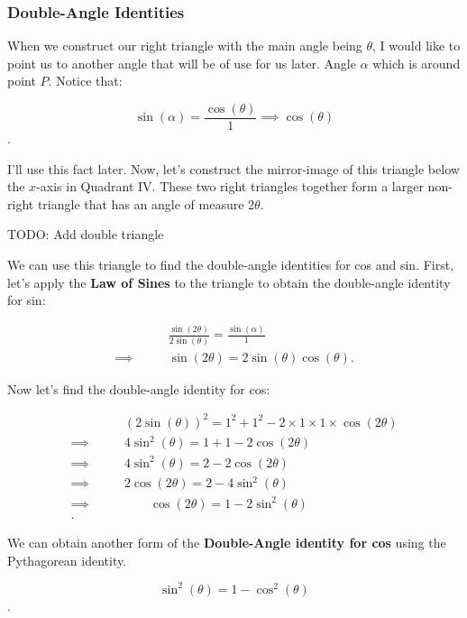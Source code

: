 
\subsubsection*{Double-Angle Identities}
\label{sub_sub_sec:double_angle_identities}

When we construct our right triangle with the main angle being $\theta$, I
would like to point us to another angle that will be of use for us later. Angle
$\alpha$ which is around point $P$. Notice that:

\[ \sin (\alpha) = \frac{\cos (\theta)}{1} \implies \cos (\theta) \].

I'll use this fact later. Now, let's construct the mirror-image of this
triangle below the $x$-axis in Quadrant IV. These two right triangles together
form a larger non-right triangle that has an angle of measure $2\theta$.

TODO: Add double triangle

We can use this triangle to find the double-angle identities for cos and sin.
First, let's apply the \textbf{Law of Sines} to the triangle to obtain the
double-angle identity for sin:

\begin{align*}
  \qquad&\frac{\sin (2\theta)}{2\sin (\theta)} = \frac{\sin (\alpha)}{1} \\
  \implies\qquad&\sin (2\theta) = 2\sin (\theta)\cos (\theta)
.\end{align*}

Now let's find the double-angle identity for cos:

\begin{align*}
  \qquad&(2\sin (\theta))^{2} = 1^{2} + 1^{2} - 2 \times 1 \times 1 \times \cos (2\theta) \\
  \implies\qquad&4\sin^{2} (\theta) = 1 + 1 - 2\cos (2\theta) \\
  \implies\qquad&4\sin^{2} (\theta) = 2 - 2\cos (2\theta) \\
  \implies\qquad&2\cos (2\theta) = 2 - 4\sin^{2} (\theta) \\
  \implies\qquad&\qquad\cos (2\theta) = 1 - 2\sin^{2} (\theta) \\
.\end{align*}

We can obtain another form of the \textbf{Double-Angle identity for cos} using the Pythagorean identity.

\[ \sin^{2} (\theta) = 1 - \cos^{2} (\theta) \].

